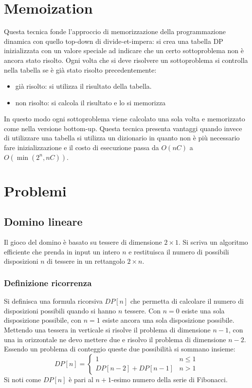 \section{Memoization}
Questa tecnica fonde l'approccio di memorizzazione della programmazione dinamica con quello top-down di divide-et-impera: si crea una tabella DP inizializzata con un valore speciale ad indicare che un certo 
sottoproblema non \`e ancora stato risolto. Ogni volta che si deve risolvere un sottoproblema si controlla nella tabella se \`e gi\`a stato risolto precedentemente:
\begin{itemize}
\item gi\`a risolto: si utilizza il risultato della tabella.
\item non risolto: si calcola il risultato e lo si memorizza
\end{itemize}
In questo modo ogni sottoproblema viene calcolato una sola volta e memorizzato come nella versione bottom-up. Questa tecnica presenta vantaggi quando invece di utilizzare una tabella si utilizza un dizionario 
in quanto non \`e pi\`u necessario fare inizializzazione e il costo di esecuzione passa da $O(nC)$ a $O(\min(2^n, nC))$.

\section{Problemi}
\subsection{Domino lineare}
Il gioco del domino \`e basato su tessere di dimensione $2\times 1$. Si scriva un algoritmo efficiente che prenda in input un intero $n$ e restituisca il numero di possibili disposizioni $n$ di tessere in un 
rettangolo $2\times n$.
\subsubsection{Definizione ricorrenza}
Si definisca una formula ricorsiva $DP[n]$ che permetta di calcolare il numero di disposizioni possibili quando si hanno $n$ tessere. Con $n=0$ esiste una sola disposizione possibile, con $n=1$ esiste ancora una
sola disposizione possibile. Mettendo una tessera in verticale si risolve il problema di dimensione $n-1$, con una in orizzontale ne devo mettere due e risolvo il problema di dimensione $n-2$. Essendo un 
problema di conteggio queste due possibilit\`a si sommano insieme:
$$
DP[n]=
\begin{cases}
1\quad & n\le 1\\
DP[n-2] + DP[n-1]& n>1
\end{cases}
$$
Si noti come $DP[n]$ \`e pari al $n+1$-esimo numero della serie di Fibonacci. 
